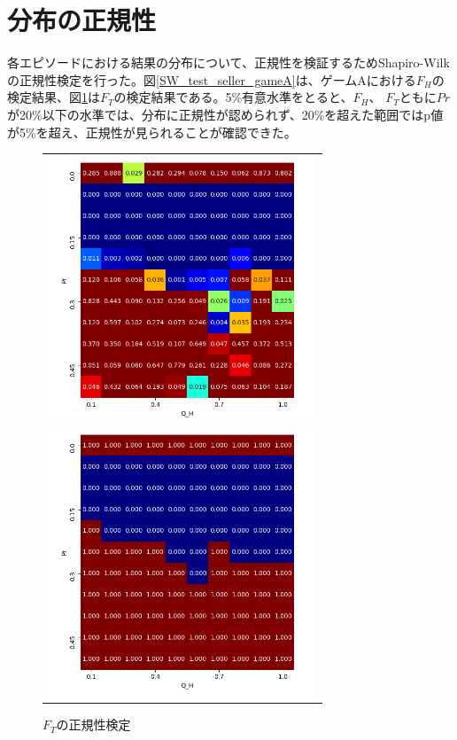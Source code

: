 \documentclass[a4paper,fontsize=11pt,report,notitlepage,line_length=38zw,number_of_lines=40,dvipdfmx]{jlreq}
\begin{document}
\section{分布の正規性}
各エピソードにおける結果の分布について、正規性を検証するためShapiro-Wilkの正規性検定を行った。図\ref{SW_test_seller_gameA}は、ゲームAにおける$F_H$の検定結果、図\ref{SW_test_buyer_gameA}は$F_T$の検定結果である。5\%有意水準をとると、$F_H$、 $F_T$ともに$Pr$が20\%以下の水準では、分布に正規性が認められず、20\%を超えた範囲ではp値が5\%を超え、正規性が見られることが確認できた。

\begin{figure}[hbtp]
  \begin{center}
    \begin{tabular}{c}
      \begin{minipage}{0.5\hsize}
        \begin{center}
          \includegraphics[width=8cm]{SW_test_seller_gameA.png}
          \caption{$F_H$の正規性検定}
          \label{SW_test_seller_gameA}
        \end{center}
      \end{minipage}

      \begin{minipage}{0.5\hsize}
        \begin{center}
          \includegraphics[width=8cm]{SW_test_buyer_gameA.png}
          \caption{$F_T$の正規性検定}
           \label{SW_test_buyer_gameA}
        \end{center}
      \end{minipage}
    \end{tabular}
  \end{center}
\end{figure}
\end{document}
